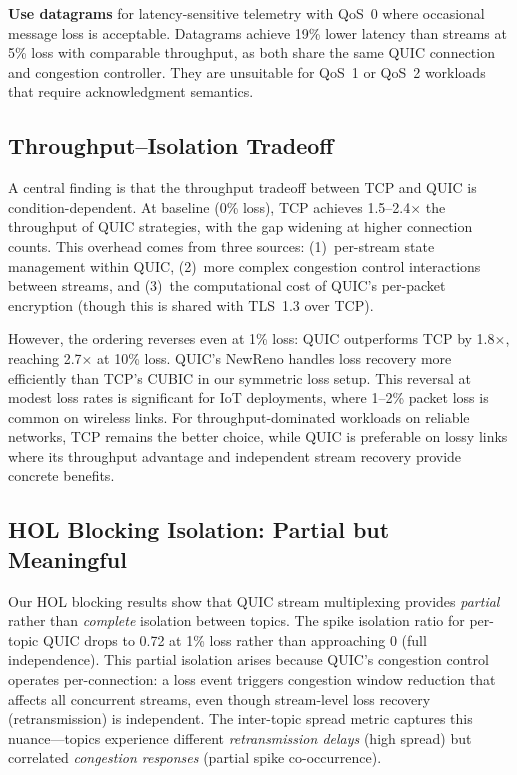 \textbf{Use datagrams} for latency-sensitive telemetry with QoS~0 where occasional message loss is acceptable. Datagrams achieve 19\% lower latency than streams at 5\% loss with comparable throughput, as both share the same QUIC connection and congestion controller. They are unsuitable for QoS~1 or QoS~2 workloads that require acknowledgment semantics.

\subsection{Throughput--Isolation Tradeoff}

A central finding is that the throughput tradeoff between TCP and QUIC is condition-dependent. At baseline (0\% loss), TCP achieves 1.5--2.4$\times$ the throughput of QUIC strategies, with the gap widening at higher connection counts. This overhead comes from three sources: (1)~per-stream state management within QUIC, (2)~more complex congestion control interactions between streams, and (3)~the computational cost of QUIC's per-packet encryption (though this is shared with TLS~1.3 over TCP).

However, the ordering reverses even at 1\% loss: QUIC outperforms TCP by 1.8$\times$, reaching 2.7$\times$ at 10\% loss. QUIC's NewReno handles loss recovery more efficiently than TCP's CUBIC in our symmetric loss setup. This reversal at modest loss rates is significant for IoT deployments, where 1--2\% packet loss is common on wireless links. For throughput-dominated workloads on reliable networks, TCP remains the better choice, while QUIC is preferable on lossy links where its throughput advantage and independent stream recovery provide concrete benefits.

\subsection{HOL Blocking Isolation: Partial but Meaningful}

Our HOL blocking results show that QUIC stream multiplexing provides \emph{partial} rather than \emph{complete} isolation between topics. The spike isolation ratio for per-topic QUIC drops to 0.72 at 1\% loss rather than approaching 0 (full independence). This partial isolation arises because QUIC's congestion control operates per-connection: a loss event triggers congestion window reduction that affects all concurrent streams, even though stream-level loss recovery (retransmission) is independent. The inter-topic spread metric captures this nuance---topics experience different \emph{retransmission delays} (high spread) but correlated \emph{congestion responses} (partial spike co-occurrence).

